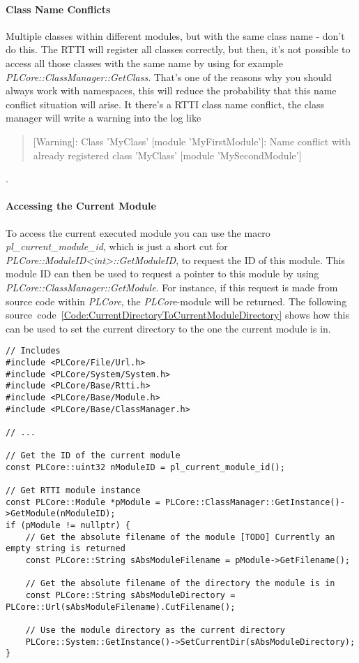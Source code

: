 \paragraph{Class Name Conflicts}
Multiple classes within different modules, but with the same class name - don't do this. The \ac{RTTI} will register all classes correctly, but then, it's not possible to access all those classes with the same name by using for example \emph{PLCore::ClassManager::GetClass}. That's one of the reasons why you should always work with namespaces, this will reduce the probability that this name conflict situation will arise. It there's a \ac{RTTI} class name conflict, the class manager will write a warning into the log like
\begin{quote}[Warning]: Class 'MyClass' [module 'MyFirstModule']: Name conflict with already registered class 'MyClass' [module 'MySecondModule']\end{quote}.


\paragraph{Accessing the Current Module}
To access the current executed module you can use the macro \emph{pl\_current\_module\_id}, which is just a short cut for \emph{PLCore::ModuleID<int>::GetModuleID}, to request the ID of this module. This module ID can then be used to request a pointer to this module by using \emph{PLCore::ClassManager::GetModule}. For instance, if this request is made from source code within \emph{PLCore}, the \emph{PLCore}-module will be returned. The following source~code~\ref{Code:CurrentDirectoryToCurrentModuleDirectory} shows how this can be used to set the current directory to the one the current module is in.
\begin{lstlisting}[label=Code:CurrentDirectoryToCurrentModuleDirectory,caption={Setting the current directory to the one the current module is in}]
// Includes
#include <PLCore/File/Url.h>
#include <PLCore/System/System.h>
#include <PLCore/Base/Rtti.h>
#include <PLCore/Base/Module.h>
#include <PLCore/Base/ClassManager.h>

// ...

// Get the ID of the current module
const PLCore::uint32 nModuleID = pl_current_module_id();

// Get RTTI module instance
const PLCore::Module *pModule = PLCore::ClassManager::GetInstance()->GetModule(nModuleID);
if (pModule != nullptr) {
	// Get the absolute filename of the module [TODO] Currently an empty string is returned
	const PLCore::String sAbsModuleFilename = pModule->GetFilename();

	// Get the absolute filename of the directory the module is in
	const PLCore::String sAbsModuleDirectory = PLCore::Url(sAbsModuleFilename).CutFilename();

	// Use the module directory as the current directory
	PLCore::System::GetInstance()->SetCurrentDir(sAbsModuleDirectory);
}
\end{lstlisting}




